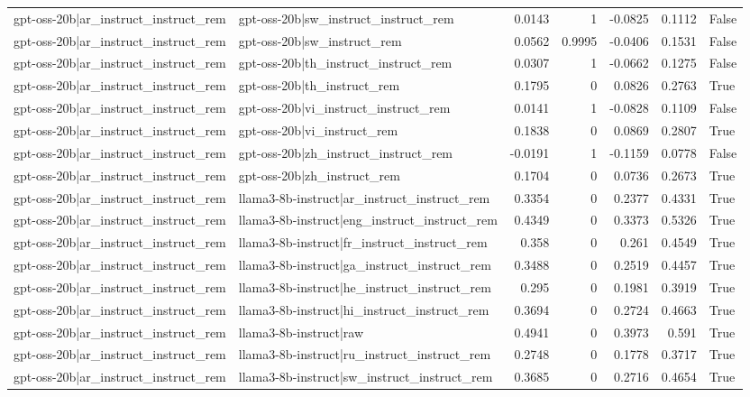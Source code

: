 \begin{table}
\begin{tabular}{l l r r r r l}
gpt-oss-20b|ar_instruct_instruct_rem & gpt-oss-20b|sw_instruct_instruct_rem & 0.0143 & 1 & -0.0825 & 0.1112 & False \\
gpt-oss-20b|ar_instruct_instruct_rem & gpt-oss-20b|sw_instruct_rem & 0.0562 & 0.9995 & -0.0406 & 0.1531 & False \\
gpt-oss-20b|ar_instruct_instruct_rem & gpt-oss-20b|th_instruct_instruct_rem & 0.0307 & 1 & -0.0662 & 0.1275 & False \\
gpt-oss-20b|ar_instruct_instruct_rem & gpt-oss-20b|th_instruct_rem & 0.1795 & 0 & 0.0826 & 0.2763 & True \\
gpt-oss-20b|ar_instruct_instruct_rem & gpt-oss-20b|vi_instruct_instruct_rem & 0.0141 & 1 & -0.0828 & 0.1109 & False \\
gpt-oss-20b|ar_instruct_instruct_rem & gpt-oss-20b|vi_instruct_rem & 0.1838 & 0 & 0.0869 & 0.2807 & True \\
gpt-oss-20b|ar_instruct_instruct_rem & gpt-oss-20b|zh_instruct_instruct_rem & -0.0191 & 1 & -0.1159 & 0.0778 & False \\
gpt-oss-20b|ar_instruct_instruct_rem & gpt-oss-20b|zh_instruct_rem & 0.1704 & 0 & 0.0736 & 0.2673 & True \\
gpt-oss-20b|ar_instruct_instruct_rem & llama3-8b-instruct|ar_instruct_instruct_rem & 0.3354 & 0 & 0.2377 & 0.4331 & True \\
gpt-oss-20b|ar_instruct_instruct_rem & llama3-8b-instruct|eng_instruct_instruct_rem & 0.4349 & 0 & 0.3373 & 0.5326 & True \\
gpt-oss-20b|ar_instruct_instruct_rem & llama3-8b-instruct|fr_instruct_instruct_rem & 0.358 & 0 & 0.261 & 0.4549 & True \\
gpt-oss-20b|ar_instruct_instruct_rem & llama3-8b-instruct|ga_instruct_instruct_rem & 0.3488 & 0 & 0.2519 & 0.4457 & True \\
gpt-oss-20b|ar_instruct_instruct_rem & llama3-8b-instruct|he_instruct_instruct_rem & 0.295 & 0 & 0.1981 & 0.3919 & True \\
gpt-oss-20b|ar_instruct_instruct_rem & llama3-8b-instruct|hi_instruct_instruct_rem & 0.3694 & 0 & 0.2724 & 0.4663 & True \\
gpt-oss-20b|ar_instruct_instruct_rem & llama3-8b-instruct|raw & 0.4941 & 0 & 0.3973 & 0.591 & True \\
gpt-oss-20b|ar_instruct_instruct_rem & llama3-8b-instruct|ru_instruct_instruct_rem & 0.2748 & 0 & 0.1778 & 0.3717 & True \\
gpt-oss-20b|ar_instruct_instruct_rem & llama3-8b-instruct|sw_instruct_instruct_rem & 0.3685 & 0 & 0.2716 & 0.4654 & True \\

\end{tabular}
\end{table}
